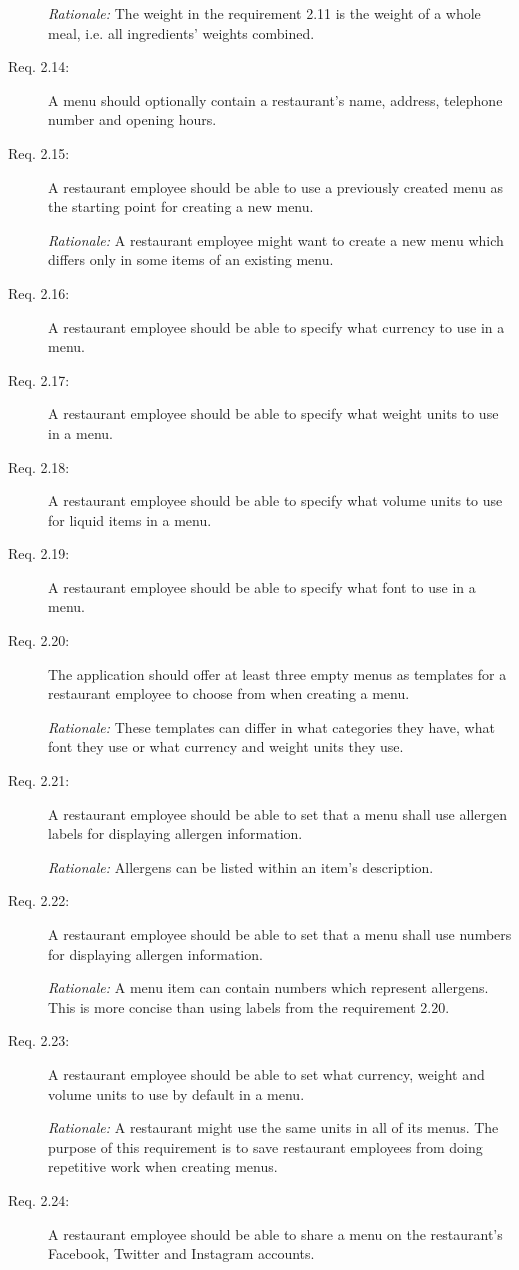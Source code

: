 \begin{description}
    \emph{Rationale:} The weight in the requirement 2.11 is the weight of a whole meal, i.e. all ingredients' weights combined.
    \item [Req. 2.14:] A menu should optionally contain a restaurant's name, address, telephone number and opening hours.
    \item [Req. 2.15:] A restaurant employee should be able to use a previously created menu as the starting point for creating a new menu.

    \emph{Rationale:} A restaurant employee might want to create a new menu which differs only in some items of an existing menu.
    \item [Req. 2.16:] A restaurant employee should be able to specify what currency to use in a menu.
    \item [Req. 2.17:] A restaurant employee should be able to specify what weight units to use in a menu.
    \item [Req. 2.18:] A restaurant employee should be able to specify what volume units to use for liquid items in a menu.
    \item [Req. 2.19:] A restaurant employee should be able to specify what font to use in a menu.
    \item [Req. 2.20:] The application should offer at least three empty menus as templates for a restaurant employee to choose from when creating a menu.

    \emph{Rationale:} These templates can differ in what categories they have, what font they use or what currency and weight units they use.
    \item [Req. 2.21:] A restaurant employee should be able to set that a menu shall use allergen labels for displaying allergen information.

    \emph{Rationale:} Allergens can be listed within an item's description.
    \item [Req. 2.22:] A restaurant employee should be able to set that a menu shall use numbers for displaying allergen information.

    \emph{Rationale:} A menu item can contain numbers which represent allergens. This is more concise than using labels from the requirement 2.20.
    \item [Req. 2.23:] A restaurant employee should be able to set what currency, weight and volume units to use by default in a menu.
  
    \emph{Rationale:} A restaurant might use the same units in all of its menus. The purpose of this requirement is to save restaurant employees from doing repetitive work when creating menus.
    \item [Req. 2.24:] A restaurant employee should be able to share a menu on the restaurant's Facebook, Twitter and Instagram accounts.
  \end{description}

